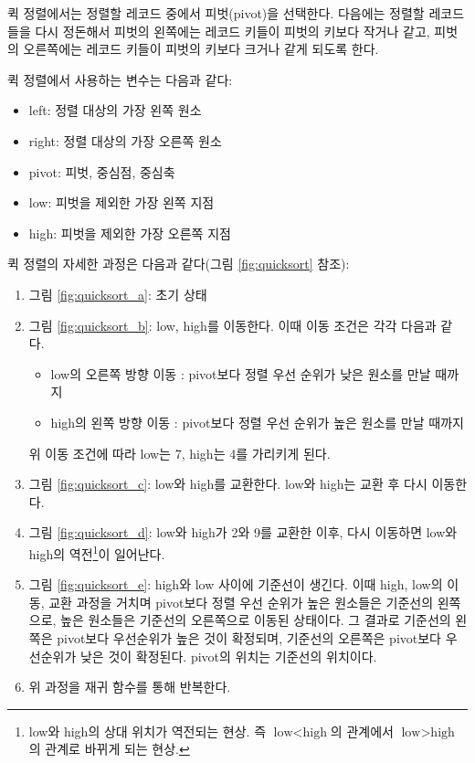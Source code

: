 \documentclass{article}
\begin{document}
퀵 정렬에서는 정렬할 레코드 중에서 피벗(pivot)을 선택한다. 다음에는 정렬할 레코드들을 다시 정돈해서 피벗의 왼쪽에는 레코드 키들이 피벗의 키보다 작거나 같고, 피벗의 오른쪽에는 레코드 키들이 피벗의 키보다 크거나 같게 되도록 한다.

퀵 정렬에서 사용하는 변수는 다음과 같다:
\begin{itemize}
    \item left: 정렬 대상의 가장 왼쪽 원소
    \item right: 정렬 대상의 가장 오른쪽 원소
    \item pivot: 피벗, 중심점, 중심축
    \item low: 피벗을 제외한 가장 왼쪽 지점
    \item high: 피벗을 제외한 가장 오른쪽 지점
\end{itemize}

퀵 정렬의 자세한 과정은 다음과 같다(그림 \ref{fig:quicksort} 참조):
\begin{enumerate}
    \item 그림 \ref{fig:quicksort_a}: 초기 상태
    \item 그림 \ref{fig:quicksort_b}: low, high를 이동한다. 이때 이동 조건은 각각 다음과 같다.
    \begin{itemize}
        \item low의 오른쪽 방향 이동 : pivot보다 정렬 우선 순위가 낮은 원소를 만날 때까지
        \item high의 왼쪽 방향 이동 : pivot보다 정렬 우선 순위가 높은 원소를 만날 때까지
    \end{itemize}
    위 이동 조건에 따라 low는 7, high는 4를 가리키게 된다.
    \item 그림 \ref{fig:quicksort_c}: low와 high를 교환한다. low와 high는 교환 후 다시 이동한다.
    \item 그림 \ref{fig:quicksort_d}: low와 high가 2와 9를 교환한 이후, 다시 이동하면 low와 high의 역전\footnote{low와 high의 상대 위치가 역전되는 현상. 즉 $\text{low} < \text{high}$의 관계에서 $\text{low} > \text{high}$의 관계로 바뀌게 되는 현상.}이 일어난다.
    \item 그림 \ref{fig:quicksort_e}: high와 low 사이에 기준선이 생긴다. 이때 high, low의 이동, 교환 과정을 거치며 pivot보다 정렬 우선 순위가 높은 원소들은 기준선의 왼쪽으로, 높은 원소들은 기준선의 오른쪽으로 이동된 상태이다. 그 결과로 기준선의 왼쪽은 pivot보다 우선순위가 높은 것이 확정되며, 기준선의 오른쪽은 pivot보다 우선순위가 낮은 것이 확정된다. pivot의 위치는 기준선의 위치이다.
    \item 위 과정을 재귀 함수를 통해 반복한다.
\end{enumerate}
\end{document}
